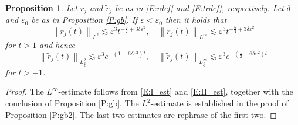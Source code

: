 \documentclass[11pt,a4paper,oneside]{amsart}
\theoremstyle{plain}
\newtheorem{proposition}[theorem]{Proposition}
\theoremstyle{remark}
\numberwithin{equation}{section}
\newcommand{\norm}[1]{\left\lVert #1\right\rVert}
\def\({\left(}
\def\){\right)}
\newcommand{\eps}{\varepsilon}
\theoremstyle{definition}
\begin{document}
%
\begin{proposition}
Let $r_j$ and $\widetilde{r}_j$ be as in \eqref{E:rdef} and \eqref{E:trdef}, respectively. 
Let $\delta$ and $\eps_0$ be as in Proposition \ref{P:gb}.
If $\eps < \eps_0$ then it holds that
\[
	\norm{r_j(t)}_{L^2}
	\lesssim \eps^3 t^{-\frac32 + 3\delta \eps^2}, \quad
	\norm{r_j(t)}_{L^\infty}
	\lesssim \eps^3 t^{-\frac54 + 3\delta \eps^2}
\]
for $t>1$
and hence
\begin{equation}\label{E:trerror}
	\norm{\widetilde{r}_j(t)}_{L^2_\xi}
	\lesssim \eps^3 e^{-(1-6\delta \eps^2)t},\quad
	\norm{\widetilde{r}_j(t)}_{L^\infty_\xi}
	\lesssim \eps^3 e^{-(\frac12-6\delta \eps^2)t}
\end{equation}
for $t>-1$.
\end{proposition}
\begin{proof}
The $L^\infty$-estimate follows from \eqref{E:I_est} and \eqref{E:II_est}, together with the conclusion of Proposition \ref{P:gb}.
The $L^2$-estimate is established in the proof of Proposition \ref{P:gb2}.
The last two estimates are rephrase of the first two.
\end{proof}
\end{document}
